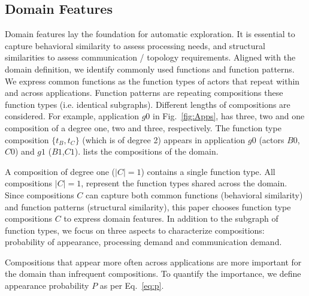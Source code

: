 \subsection{Domain Features}
\label{sec:features}
Domain features lay the foundation for automatic exploration. It is essential to capture behavioral similarity to assess processing needs, and structural similarities to assess communication / topology requirements. Aligned with the domain definition, we identify commonly used functions and function patterns. We express common functions as the function types of actors that repeat within and across applications. Function patterns are repeating compositions these function types (i.e. identical subgraphs). Different lengths of compositions are considered. For example, application $g0$ in Fig.~\ref{fig:Apps}, has three, two and one composition of a degree one, two and three, respectively. The function type composition $\{t_{B}, t_{C}\}$ (which is of degree 2) appears in application $g0$ (actors $B0$,$C0$) and $g1$ ($B1$,$C1$).  lists the compositions of the domain.

%

A composition of degree one ($\left\vert{C}\right\vert = 1$) contains a single function type. All compositions $\left\vert{C}\right\vert = 1$, represent the function types shared across the domain. Since compositions $C$ can capture both common functions (behavioral similarity) and function patterns (structural similarity), this paper chooses function type compositions $C$ to express domain features. In addition to the subgraph of function types, we focus on three aspects to characterize compositions: probability of appearance, processing demand and communication demand. 

Compositions that appear more often across applications are more important for the domain than infrequent compositions. To quantify the importance, we define appearance probability $P$ as per Eq.~\eqref{eq:p}. 


